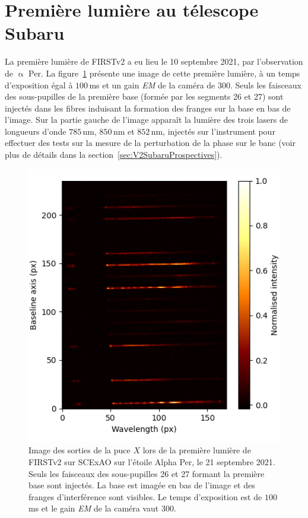 \section{Première lumière au télescope Subaru}

La première lumière de \ac{FIRSTv2} a eu lieu le 10 septembre 2021, par l'observation de $\upalpha$ Per. La figure~\ref{fig:V2FirstLight} présente une image de cette première lumière, à un temps d'exposition égal à $100 \,$ms et un gain \textit{EM} de la caméra de $300$. Seuls les faisceaux des sous-pupilles de la première base (formée par les segments 26 et 27) sont injectés dans les fibres induisant la formation des franges sur la base en bas de l'image. Sur la partie gauche de l'image apparaît la lumière des trois lasers de longueurs d'onde $785 \,$nm, $850 \,$nm et $852 \,$nm, injectés sur l'instrument pour effectuer des tests sur la mesure de la perturbation de la phase sur le banc (voir plus de détails dans la section~\ref{sec:V2SubaruProspectives}).

\begin{figure}[ht!]
    \centering
    \includegraphics[width=\figwidth]{Figure_Chap5/20210910_AlphaPer_ODLseq1_Base1_2_Image001.png}
    \caption[Image des sorties de la puce $X$ lors de la première lumière de FIRSTv2 sur SCExAO sur l'étoile Alpha Per, le 21 septembre 2021.]{Image des sorties de la puce $X$ lors de la première lumière de FIRSTv2 sur SCExAO sur l'étoile Alpha Per, le 21 septembre 2021. Seuls les faisceaux des sous-pupilles 26 et 27 formant la première base sont injectés. La base est imagée en bas de l'image et des franges d'interférence sont visibles. Le temps d'exposition est de $100 \,$ms et le gain \textit{EM} de la caméra vaut 300.}
    \label{fig:V2FirstLight}
\end{figure}

